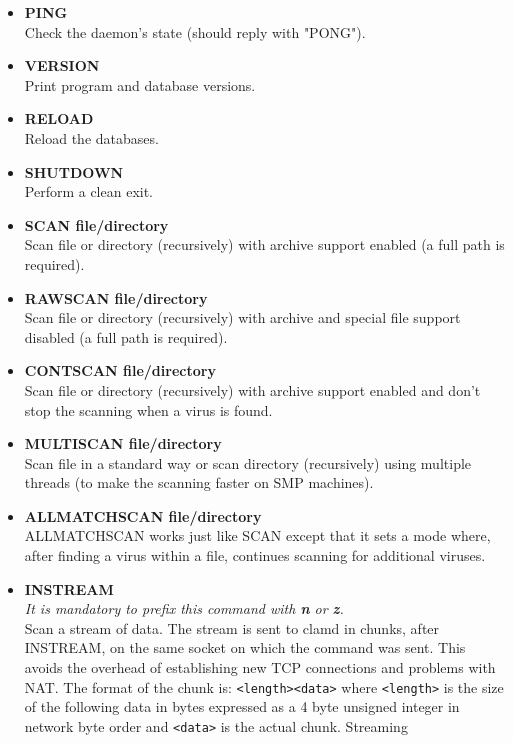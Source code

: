 \documentclass[a4paper,titlepage,12pt]{article}
\begin{document}
    \begin{itemize}
	\item \textbf{PING}\\
	    Check the daemon's state (should reply with "PONG").
	\item \textbf{VERSION}\\
	    Print program and database versions.
	\item \textbf{RELOAD}\\
	    Reload the databases.
	\item \textbf{SHUTDOWN}\\
	    Perform a clean exit.
	\item \textbf{SCAN file/directory}\\
	    Scan file or directory (recursively) with archive support
	    enabled (a full path is required).
	\item \textbf{RAWSCAN file/directory}\\
	    Scan file or directory (recursively) with archive and special file
	    support disabled (a full path is required).
	\item \textbf{CONTSCAN file/directory}\\
	    Scan file or directory (recursively) with archive support
	    enabled and don't stop the scanning when a virus is found.
	\item \textbf{MULTISCAN file/directory}\\
	    Scan file in a standard way or scan directory (recursively) using
	    multiple threads (to make the scanning faster on SMP machines).
	\item \textbf{ALLMATCHSCAN file/directory}\\
	    ALLMATCHSCAN works just like SCAN except that it sets a mode
	    where, after finding a virus within a file, continues scanning for
            additional viruses.
	\item \textbf{INSTREAM}\\
	    \emph{It is mandatory to prefix this command with \textbf{n} or
	    \textbf{z}.}\\
	    Scan a stream of data. The stream is sent to clamd in chunks,
	    after INSTREAM, on the same socket on which the command
	    was sent. This avoids the overhead of establishing new TCP
	    connections and problems with NAT. The format of the chunk is:
	    \verb+<length><data>+ where \verb+<length>+ is the size of the
	    following data in bytes expressed as a 4 byte unsigned integer in
	    network byte order and \verb+<data>+ is the actual chunk. Streaming

\end{itemize}
\end{document}

